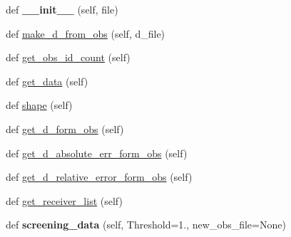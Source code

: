 \begin{DoxyCompactItemize}
\item 
\mbox{\label{classMIS_1_1Muon__Imaging__Algorithm_1_1InvDataTools_1_1obs__tools_1_1obs__tools_a42fd78cef9076d8f234fb3db80017856}} 
def {\bfseries \+\_\+\+\_\+init\+\_\+\+\_\+} (self, file)
\item 
def \hyperlink{classMIS_1_1Muon__Imaging__Algorithm_1_1InvDataTools_1_1obs__tools_1_1obs__tools_a89865176433bd79fd1b2849cac70b839}{make\+\_\+d\+\_\+from\+\_\+obs} (self, d\+\_\+file)
\item 
def \hyperlink{classMIS_1_1Muon__Imaging__Algorithm_1_1InvDataTools_1_1obs__tools_1_1obs__tools_a04d200682edd5f2cf696374520c33c95}{get\+\_\+obs\+\_\+id\+\_\+count} (self)
\item 
def \hyperlink{classMIS_1_1Muon__Imaging__Algorithm_1_1InvDataTools_1_1obs__tools_1_1obs__tools_a30a028a02535ad37ac713fb77d878797}{get\+\_\+data} (self)
\item 
def \hyperlink{classMIS_1_1Muon__Imaging__Algorithm_1_1InvDataTools_1_1obs__tools_1_1obs__tools_ad0eaaf1cf6b05188e6255b434461fac3}{shape} (self)
\item 
def \hyperlink{classMIS_1_1Muon__Imaging__Algorithm_1_1InvDataTools_1_1obs__tools_1_1obs__tools_a156b45d945d308b7871896476f0e4951}{get\+\_\+d\+\_\+form\+\_\+obs} (self)
\item 
def \hyperlink{classMIS_1_1Muon__Imaging__Algorithm_1_1InvDataTools_1_1obs__tools_1_1obs__tools_a22a92aa3ced91228df6bc61987f3c94a}{get\+\_\+d\+\_\+absolute\+\_\+err\+\_\+form\+\_\+obs} (self)
\item 
def \hyperlink{classMIS_1_1Muon__Imaging__Algorithm_1_1InvDataTools_1_1obs__tools_1_1obs__tools_af1516ff720c44813c7a2c98ec19a2d61}{get\+\_\+d\+\_\+relative\+\_\+error\+\_\+form\+\_\+obs} (self)
\item 
def \hyperlink{classMIS_1_1Muon__Imaging__Algorithm_1_1InvDataTools_1_1obs__tools_1_1obs__tools_a988dfbbdaf3a1d3188e3271f9283e28a}{get\+\_\+receiver\+\_\+list} (self)
\item 
\mbox{\label{classMIS_1_1Muon__Imaging__Algorithm_1_1InvDataTools_1_1obs__tools_1_1obs__tools_ad0d4309f13479d0fb2781c6bdd0ea807}} 
def {\bfseries screening\+\_\+data} (self, Threshold=1., new\+\_\+obs\+\_\+file=None)
\end{DoxyCompactItemize}


